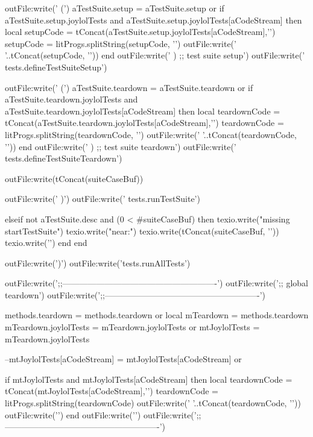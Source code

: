       outFile:write('    (\n')
      aTestSuite.setup = aTestSuite.setup or { }
      if aTestSuite.setup.joylolTests and
        aTestSuite.setup.joylolTests[aCodeStream] then
        local setupCode = tConcat(aTestSuite.setup.joylolTests[aCodeStream],'\n  ')
        setupCode = litProgs.splitString(setupCode, '\n')
        outFile:write('    '..tConcat(setupCode, '\n    '))
      end
      outFile:write('    ) ;; test suite setup\n')
      outFile:write('    tests.defineTestSuiteSetup\n\n')

      outFile:write('    (\n')
      aTestSuite.teardown = aTestSuite.teardown or { }
      if aTestSuite.teardown.joylolTests and
        aTestSuite.teardown.joylolTests[aCodeStream] then
        local teardownCode = tConcat(aTestSuite.teardown.joylolTests[aCodeStream],'\n  ')
        teardownCode = litProgs.splitString(teardownCode, '\n')
        outFile:write('    '..tConcat(teardownCode, '\n    '))
      end
      outFile:write('    ) ;; test suite teardown\n')
      outFile:write('    tests.defineTestSuiteTeardown\n\n')

      outFile:write(tConcat(suiteCaseBuf))

      outFile:write('  )\n')
      outFile:write('  tests.runTestSuite\n\n')
      
    elseif not aTestSuite.desc and (0 < #suiteCaseBuf) then
      texio.write("\nERROR missing \\startTestSuite\n")
      texio.write("near:\n")
      texio.write(tConcat(suiteCaseBuf, '\n'))
      texio.write('\n')
    end
  end
  
  outFile:write(')\n')
  outFile:write('tests.runAllTests\n\n')

  outFile:write(';;-------------------------------------------------------\n')
  outFile:write(';; global teardown\n')
  outFile:write(';;-------------------------------------------------------\n\n')
  
  methods.teardown      = methods.teardown or { }
  local mTeardown       = methods.teardown
  mTeardown.joylolTests = mTeardown.joylolTests or { }
  mtJoylolTests         = mTeardown.joylolTests

  --mtJoylolTests[aCodeStream] = mtJoylolTests[aCodeStream] or { }

  if mtJoylolTests and
    mtJoylolTests[aCodeStream] then
    local teardownCode = tConcat(mtJoylolTests[aCodeStream],'\n')
    teardownCode       = litProgs.splitString(teardownCode)
    outFile:write('  '..tConcat(teardownCode, '\n  '))
    outFile:write('\n')
  end
  outFile:write('\n')
  outFile:write(';;-------------------------------------------------------\n')

